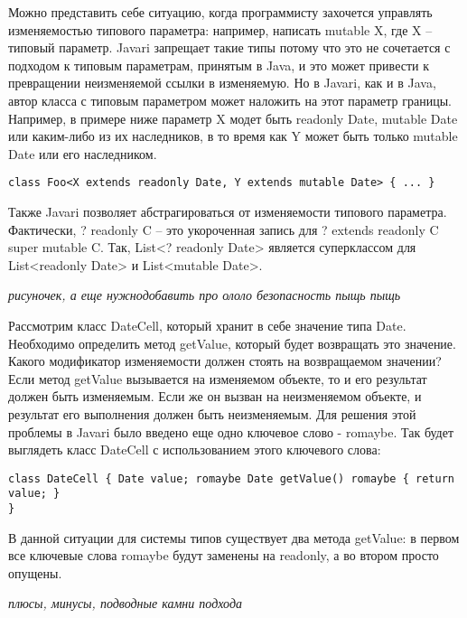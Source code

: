 Можно представить себе ситуацию, когда программисту захочется управлять изменяемостью типового параметра: например, написать mutable X, где X -- типовый параметр. Javari запрещает такие типы потому что это не сочетается с подходом к типовым параметрам, принятым в Java, и это может привести к превращении неизменяемой ссылки в изменяемую. Но в Javari, как и в Java, автор класса с типовым параметром может наложить на этот параметр границы. Например, в примере ниже параметр X модет быть readonly Date, mutable Date или каким-либо из их наследников, в то время как Y может быть только mutable Date или его наследником. 

\begin{lstlisting}[caption=Объявление класса с типовыми параметрами, label=code:javari_generic_class]
class Foo<X extends readonly Date, Y extends mutable Date> { ... }
\end{lstlisting} 

Также Javari позволяет абстрагироваться от изменяемости типового параметра. Фактически, ? readonly C -- это укороченная запись для ? extends readonly C super mutable C. Так, List<? readonly Date> является суперклассом для List<readonly Date> и List<mutable Date>. 

\textit{рисуночек, а еще нужнодобавить про ололо безопасность пыщь пыщь}

Рассмотрим класс DateCell, который хранит в себе значение типа Date. Необходимо определить метод getValue, который будет возвращать это значение. Какого модификатор изменяемости должен стоять на возвращаемом значении? Если метод getValue вызывается на изменяемом объекте, то и его результат должен быть изменяемым. Если же он вызван на неизменяемом объекте, и результат его выполнения должен быть неизменяемым. Для решения этой проблемы в Javari было введено еще одно ключевое слово - romaybe. Так будет выглядеть класс DateCell с использованием этого ключевого слова:

\begin{lstlisting}[caption=Ключевое слово romaybe, label=code:javari_romaybe]
class DateCell { Date value; romaybe Date getValue() romaybe { return value; }
}
\end{lstlisting}

В данной ситуации для системы типов существует два метода getValue: в первом все ключевые слова romaybe будут заменены на readonly, а во втором просто опущены. 

\textit{плюсы, минусы, подводные камни подхода}

